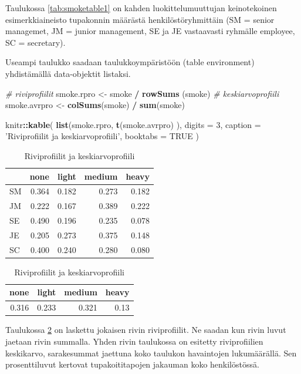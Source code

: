 \documentclass[
  finnish,
]{book}
\newenvironment{Shaded}{\begin{snugshade}}{\end{snugshade}}
\newcommand{\CommentTok}[1]{\textcolor[rgb]{0.56,0.35,0.01}{\textit{#1}}}
\newcommand{\DataTypeTok}[1]{\textcolor[rgb]{0.13,0.29,0.53}{#1}}
\newcommand{\DecValTok}[1]{\textcolor[rgb]{0.00,0.00,0.81}{#1}}
\newcommand{\KeywordTok}[1]{\textcolor[rgb]{0.13,0.29,0.53}{\textbf{#1}}}
\newcommand{\NormalTok}[1]{#1}
\newcommand{\OperatorTok}[1]{\textcolor[rgb]{0.81,0.36,0.00}{\textbf{#1}}}
\newcommand{\OtherTok}[1]{\textcolor[rgb]{0.56,0.35,0.01}{#1}}
\newcommand{\StringTok}[1]{\textcolor[rgb]{0.31,0.60,0.02}{#1}}
\begin{document}
Taulukossa \ref{tab:smoketable1} on kahden luokittelumuuttujan keinotekoinen esimerkkiaineisto tupakonnin määrästä henkilöstöryhmittäin (SM = senior managemet, JM = junior management, SE ja JE vastaavasti ryhmälle employee, SC = secretary).

Useampi taulukko saadaan taulukkoympäristöön (table environment) yhdistämällä data-objektit listaksi.

\begin{Shaded}
\begin{Highlighting}[]
\CommentTok{# riviprofiilit}
\NormalTok{smoke.rpro <-}\StringTok{ }\NormalTok{smoke }\OperatorTok{/}\StringTok{ }\KeywordTok{rowSums}\NormalTok{ (smoke)}
\CommentTok{# keskiarvoprofiili}
\NormalTok{smoke.avrpro <-}\StringTok{ }\KeywordTok{colSums}\NormalTok{(smoke) }\OperatorTok{/}\StringTok{ }\KeywordTok{sum}\NormalTok{(smoke)}

\NormalTok{knitr}\OperatorTok{::}\KeywordTok{kable}\NormalTok{(}
  \KeywordTok{list}\NormalTok{(smoke.rpro, }\KeywordTok{t}\NormalTok{(smoke.avrpro)   ), }\DataTypeTok{digits =} \DecValTok{3}\NormalTok{,}
  \DataTypeTok{caption =} \StringTok{'Riviprofiilit ja keskiarvoprofiili'}\NormalTok{, }\DataTypeTok{booktabs =} \OtherTok{TRUE}
\NormalTok{)}
\end{Highlighting}
\end{Shaded}

\begin{table}
\caption{\label{tab:smoketable2}Riviprofiilit ja keskiarvoprofiili}

\centering
\begin{tabular}[t]{lrrrr}
\toprule
  & none & light & medium & heavy\\
\midrule
SM & 0.364 & 0.182 & 0.273 & 0.182\\
JM & 0.222 & 0.167 & 0.389 & 0.222\\
SE & 0.490 & 0.196 & 0.235 & 0.078\\
JE & 0.205 & 0.273 & 0.375 & 0.148\\
SC & 0.400 & 0.240 & 0.280 & 0.080\\
\bottomrule
\end{tabular}
\centering
\begin{tabular}[t]{rrrr}
\toprule
none & light & medium & heavy\\
\midrule
0.316 & 0.233 & 0.321 & 0.13\\
\bottomrule
\end{tabular}
\end{table}

Taulukossa \ref{tab:smoketable2} on laskettu jokaisen rivin riviprofiilit. Ne saadan kun rivin luvut jaetaan rivin summalla. Yhden rivin taulukossa on esitetty riviprofiilien keskikarvo, sarakesummat jaettuna koko taulukon havaintojen lukumäärällä. Sen prosenttiluvut kertovat tupakoititapojen jakauman koko henkilöstössä.
\end{document}
